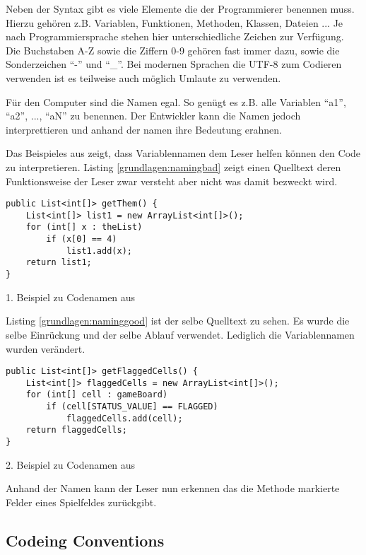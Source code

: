 Neben der Syntax gibt es viele Elemente die der Programmierer benennen muss.
Hierzu gehören z.B. Variablen, Funktionen, Methoden, Klassen, Dateien ...
Je nach Programmiersprache stehen hier unterschiedliche Zeichen zur Verfügung.
Die Buchstaben A-Z sowie die Ziffern 0-9 gehören fast immer dazu, sowie die
Sonderzeichen \enquote{-} und \enquote{\_}. Bei modernen Sprachen die UTF-8
zum Codieren verwenden ist es teilweise auch möglich Umlaute zu verwenden.

Für den Computer sind die Namen egal. So genügt es z.B. alle Variablen \enquote{a1},
\enquote{a2}, ..., \enquote{aN} zu benennen. Der Entwickler kann die Namen jedoch interprettieren und
anhand der namen ihre Bedeutung erahnen.

Das Beispieles aus \cite[S. 46-47]{Martin} zeigt, dass Variablennamen dem
Leser helfen können den Code zu interpretieren.
Listing \ref{grundlagen:namingbad} zeigt einen Quelltext deren Funktionsweise
der Leser zwar versteht aber nicht was damit bezweckt wird.

\begin{listing}
    \begin{verbatim}
public List<int[]> getThem() {
    List<int[]> list1 = new ArrayList<int[]>();
    for (int[] x : theList)
        if (x[0] == 4)
            list1.add(x);
    return list1;
}
    \end{verbatim}
    \caption{1. Beispiel zu Codenamen aus \cite[S. 46]{Martin}}
    \label{grundlagen:namingbad}
\end{listing}

Listing \ref{grundlagen:naminggood} ist der selbe Quelltext zu sehen.
Es wurde die selbe Einrückung und der selbe Ablauf verwendet. Lediglich
die Variablennamen wurden verändert.

\begin{listing}
    \begin{verbatim}
public List<int[]> getFlaggedCells() {
    List<int[]> flaggedCells = new ArrayList<int[]>();
    for (int[] cell : gameBoard)
        if (cell[STATUS_VALUE] == FLAGGED)
            flaggedCells.add(cell);
    return flaggedCells;
}
    \end{verbatim}
    \caption{2. Beispiel zu Codenamen aus \cite[S. 47]{Martin}}
    \label{grundlagen:naminggood}
\end{listing}

Anhand der Namen kann der Leser nun erkennen das die Methode markierte Felder eines Spielfeldes zurückgibt.

\subsection{Codeing Conventions}


